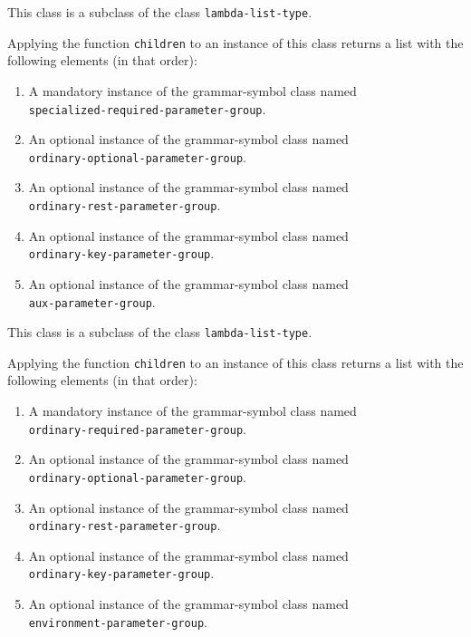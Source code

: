 This class is a subclass of the class \texttt{lambda-list-type}.


Applying the function \texttt{children} to an instance of this class
returns a list with the following elements (in that order):

\begin{enumerate}
\item A mandatory instance of the grammar-symbol class named\\
  \texttt{specialized-required-parameter-group}.
\item An optional instance of the grammar-symbol class named\\
  \texttt{ordinary-optional-parameter-group}.
\item An optional instance of the grammar-symbol class named\\
\texttt{ordinary-rest-parameter-group}.
\item An optional instance of the grammar-symbol class named\\
\texttt{ordinary-key-parameter-group}.
\item An optional instance of the grammar-symbol class named\\
\texttt{aux-parameter-group}.
\end{enumerate}

This class is a subclass of the class \texttt{lambda-list-type}.


Applying the function \texttt{children} to an instance of this class
returns a list with the following elements (in that order):

\begin{enumerate}
\item A mandatory instance of the grammar-symbol class named\\
  \texttt{ordinary-required-parameter-group}.
\item An optional instance of the grammar-symbol class named\\
  \texttt{ordinary-optional-parameter-group}.
\item An optional instance of the grammar-symbol class named\\
\texttt{ordinary-rest-parameter-group}.
\item An optional instance of the grammar-symbol class named\\
\texttt{ordinary-key-parameter-group}.
\item An optional instance of the grammar-symbol class named\\
\texttt{environment-parameter-group}.
\end{enumerate}

